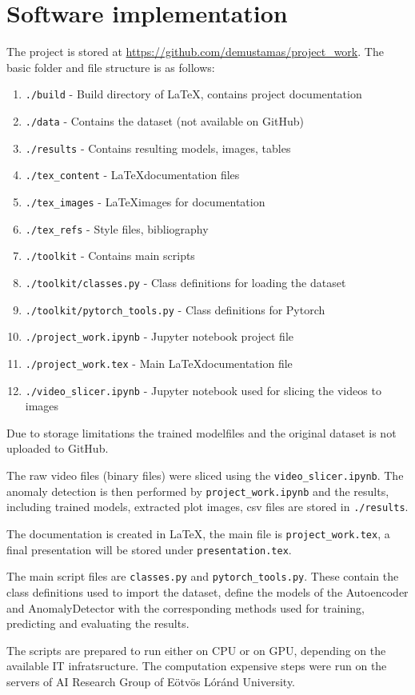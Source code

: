 \section{Software implementation} \label{sw_code}
The project is stored at \url{https://github.com/demustamas/project_work}.
The basic folder and file structure is as follows:

\begin{enumerate}
    \item \lstinline{./build} - Build directory of \LaTeX, contains project documentation
    \item \lstinline{./data} - Contains the dataset (not available on GitHub)
    \item \lstinline{./results} - Contains resulting models, images, tables
    \item \lstinline{./tex_content} - \LaTeX documentation files
    \item \lstinline{./tex_images} - \LaTeX images for documentation
    \item \lstinline{./tex_refs} - Style files, bibliography
    \item \lstinline{./toolkit} - Contains main scripts
    \item \lstinline{./toolkit/classes.py} - Class definitions for loading the dataset
    \item \lstinline{./toolkit/pytorch_tools.py} - Class definitions for Pytorch
    \item \lstinline{./project_work.ipynb} - Jupyter notebook project file
    \item \lstinline{./project_work.tex} - Main \LaTeX documentation file
    \item \lstinline{./video_slicer.ipynb} - Jupyter notebook used for slicing the videos to images
\end{enumerate}

Due to storage limitations the trained modelfiles and the original dataset is not uploaded to GitHub.

The raw video files (binary files) were sliced using the \lstinline{video_slicer.ipynb}.
The anomaly detection is then performed by \lstinline{project_work.ipynb} and the results,
including trained models, extracted plot images, csv files are stored in \lstinline{./results}.

The documentation is created in \LaTeX, the main file is \lstinline{project_work.tex},
a final presentation will be stored under \lstinline{presentation.tex}.

The main script files are \lstinline{classes.py} and \lstinline{pytorch_tools.py}.
These contain the class definitions used to import the dataset, define the models
of the Autoencoder and AnomalyDetector with the corresponding methods used for training,
predicting and evaluating the results.

The scripts are prepared to run either on CPU or on GPU, depending on the available IT infratsructure.
The computation expensive steps were run on the servers of AI Research Group of Eötvös Lóránd University.